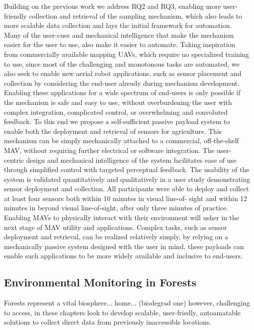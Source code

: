 Building on the previous work we address RQ2 and RQ3, enabling more user-friendly collection and retrieval of the sampling mechanism, which also leads to more scalable data collection and lays the initial framework for automation. Many of the user-cues and mechanical intelligence that make the mechanism easier for the user to use, also make it easier to automate. Taking inspiration from commercially available mapping UAVs, which require no specialized training to use, since most of the challenging and monotonous tasks are automated, we also seek to enable new aerial robot applications, such as sensor placement and collection by considering the end-user already during mechanism development. Enabling these applications for a wide spectrum of end-users is only possible if the mechanism is safe and easy to use, without overburdening the user with complex integration, complicated control, or overwhelming and convoluted feedback. To this end we propose a self-sufficient passive payload system to enable both the deployment and retrieval of sensors for agriculture. This mechanism can be simply mechanically attached to a commercial, off-the-shelf MAV, without requiring further electrical or software integration. The user-centric design and mechanical intelligence of the system facilitates ease of use through simplified control with targeted perceptual feedback. The usability of the system is validated quantitatively and qualitatively in a user study demonstrating sensor deployment and collection. All participants were able to deploy and collect at least four sensors both within 10 minutes in visual line-of- sight and within 12 minutes in beyond visual line-of-sight, after only three minutes of practice. Enabling MAVs to physically interact with their environment will usher in the next stage of MAV utility and applications. Complex tasks, such as sensor deployment and retrieval, can be realized relatively simply, by relying on a mechanically passive system designed with the user in mind, these payloads can enable such applications to be more widely available and inclusive to end-users.



\subsection{Environmental Monitoring in Forests}
Forests represent a vital biosphere... home... (biodegrad one)
however, challenging to access, in these chapters look to develop scalable, user-friedly, autoamatable solutions to collect direct data from previously inaccessible locations.

